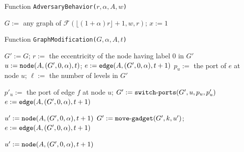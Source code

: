 \documentclass[11pt]{article}
\begin{document}
{\begin{algorithm}[H]
\label{alg:alg0}
\caption{Function {\tt AdversaryBehavior($r,\alpha,A,w$)}}
\SetNoFillComment
{}
\small
{}
$G :=$ any graph of $\mathcal{F}(\lfloor(1+\alpha)r\rfloor+1,w,r)$; $x := 1$\;\label{ligne:alg0:1}
\end{algorithm}




\begin{algorithm}[H]
\label{alg:alg1}
\caption{Function {\tt GraphModification($G,\alpha,A,t$)}}
\small
$G' := G$; $r :=$ the eccentricity of the node having label $0$ in $G'$\;\label{ligne:1}
$u := {\tt node}(A,(G',0,\alpha),t)$; $e := {\tt edge}(A,(G',0,\alpha),t+1)$\;\label{ligne:2}
$p_u := $ the port of $e$ at node $u$; $\ell :=$ the number of levels in $G'$\;
{
{
$p'_u :=$ the port of edge $f$ at node $u$; $G':= {\tt switch\mbox{-}ports}(G',u,p_u,p'_u)$\;\label{ligne:modif:1}
 $e := {\tt edge}(A,(G',0,\alpha),t+1)$\;}\label{ligne:modif:e:1}\label{ligne:7}

{
$u' := {\tt node}(A,(G',0,\alpha),t+1)$\;\label{ligne:modif:2:deb}
$G' := {\tt move\mbox{-}gadget}(G',k,u')$; $e := {\tt edge}(A,(G',0,\alpha),t+1)$\;\label{ligne:modif:2}\label{ligne:modif:e:2}
}

$u' := {\tt node}(A,(G',0,\alpha),t+1)$\;\label{ligne:modif:2:fin} \label{ligne:11}
 
}
\end{algorithm}}
\end{document}
